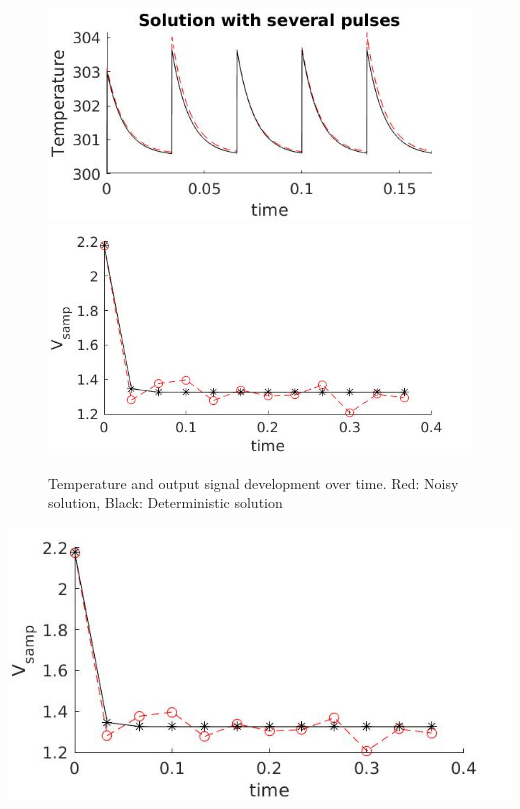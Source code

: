 \begin{figure}
\begin{center}
\includegraphics[scale=0.35]{gfx/several_pulses.jpg}
\includegraphics[scale=0.35]{gfx/vsamp.jpg}  	
  \caption{Temperature and output signal development over time. Red: Noisy solution, Black: Deterministic solution}
  \label{fig:noisysol}
  \end{center}
\end{figure}


\begin{center}
\includegraphics[scale=0.35]{gfx/vsamp.jpg} 	 
\end{center}

